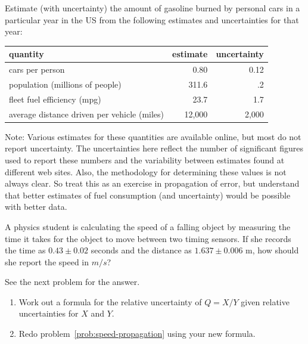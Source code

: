 \documentclass[twoside]{book}\usepackage[]{graphicx}\usepackage[]{xcolor}
\begin{document}
\begin{problem}
	Estimate (with uncertainty) 
	the amount of gasoline burned by personal cars in a particular
	year in the US from the following estimates and uncertainties for that
	year:

	\begin{center}
		\begin{tabular}{lrr}
			\hline
			quantity & estimate & uncertainty
			\\
			\hline
			cars per person & 0.80 & 0.12
			\\
			population (millions of people) & 311.6 & .2 
			\\
			fleet fuel efficiency (mpg) & 23.7 & 1.7 
			\\
			average distance driven per vehicle (miles) & 12,000 & 2,000 
			\\
			\hline
		\end{tabular}
	\end{center}

	Note:  Various estimates for these quantities are available online, but 
	most do not report uncertainty.  The uncertainties here reflect the 
	number of significant figures used to report these numbers and the 
	variability between estimates found at different web sites.
	Also, the methodology for determining these values is not always
	clear.  So treat this as an exercise in propagation of error, but 
	understand that better estimates of fuel consumption (and uncertainty)
	would be possible with better data.
\end{problem}



\begin{problem}
	\label{prob:speed-propagation}%
	A physics student is calculating the speed of a falling object by measuring the time
	it takes for the object to move between two timing sensors.
	If she records the time as $0.43 \pm 0.02$ seconds and the distance as 
	$1.637 \pm 0.006$ m, how should she report the speed in $m/s$?
\end{problem}

\begin{solution}
	See the next problem for the answer.
\end{solution}


\begin{problem}
	\begin{enumerate}
		\item
			Work out a formula for the relative uncertainty of $Q = X/Y$ given
			relative uncertainties for $X$ and $Y$.
		\item
			Redo problem~\ref{prob:speed-propagation} using your new formula.
	\end{enumerate}
\end{problem}
\end{document}
